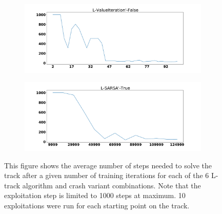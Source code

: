 \documentclass{amsart}
\begin{document}
\begin{figure}
\begin{subfigure}[t]{0.3\textwidth}
    \end{subfigure}
    \begin{subfigure}[t]{0.3\textwidth}
    \centering
    \includegraphics[width=\textwidth]{Ltrack_1_learning_rate.pdf}
    \end{subfigure}
    \begin{subfigure}[t]{0.3\textwidth}
    \centering
    \includegraphics[width=\textwidth]{Ltrack_4_learning_rate.pdf}
    \end{subfigure}
    \caption{This figure shows the average number of steps needed to solve the track after a given number of
    training iterations for each of the 6 L-track algorithm and crash variant combinations. Note that the exploitation
    step is limited to 1000 steps at maximum. 10 exploitations were run for each starting point on the track.}
    \end{figure}
\end{document}
